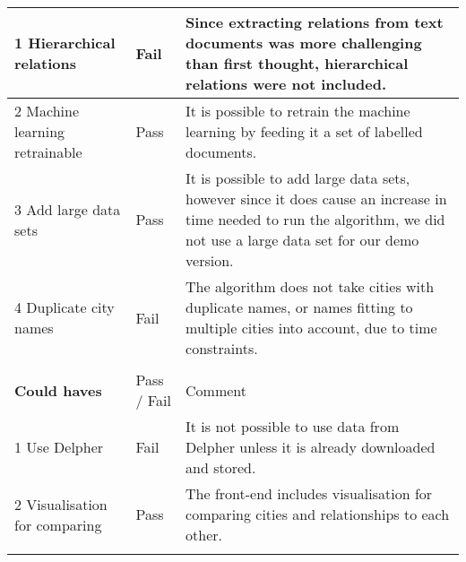\begin{table}[H]
\begin{tabular}{ll m{8cm}}
1 Hierarchical relations       & Fail        & Since extracting relations from text documents was more challenging than first thought, hierarchical relations were not included.                                                         \\ \hline
2 Machine learning retrainable & Pass        & It is possible to retrain the machine learning by feeding it a set of labelled documents.                                                                                                                                              \\ \hline
3 Add large data sets           & Pass        & It is possible to add large  data sets, however since it does cause an increase in time needed to run the algorithm, we did not use a large data set for our demo version.                     \\ \hline
4 Duplicate city names         & Fail        & The algorithm does not take cities with duplicate names, or names fitting to multiple cities into account, due to time constraints.                                                         \\
                               &             &                                                                                                                                                                                                                                       \\
\textbf{Could haves}                    & Pass / Fail & Comment                                                                                                                                                                                                                               \\
1 Use Delpher                  & Fail        & It is not possible to use data from Delpher unless it is already downloaded and stored.                                                                                                                                               \\ \hline
2 Visualisation for comparing  & Pass        & The front-end includes visualisation for comparing cities and relationships to each other.                                                                                                                                            \\
                               &             &                                                                                                                                                                                                                                       \\

\end{tabular}
\end{table}
